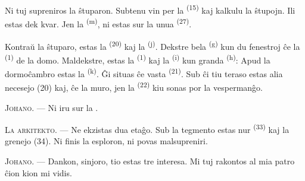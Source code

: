 Ni tuj supreniros la ŝtuparon. Subtenu vin per la 
\textsuperscript{(15)} kaj kalkulu la ŝtupojn. Ili estas dek kvar. Jen la
 \textsuperscript{(m)}, ni estas sur la unua 
\textsuperscript{(27)}.

\VUsaut{3.0mm}
\VUsaut{3.0mm}

Kontraŭ la ŝtuparo, estas la  \textsuperscript{(20)} kaj la
 \textsuperscript{(j)}. Dekstre bela 
\textsuperscript{(g)} kun du fenestroj ĉe la 
\textsuperscript{(1)} de la domo. Maldekstre, estas la 
\textsuperscript{(1)} kaj la  \textsuperscript{(i)}
kun granda  \textsuperscript{(h)}: Apud la dormoĉambro estas la
 \textsuperscript{(k)}. Ĝi situas ĉe vasta
 \textsuperscript{(21)}. Sub ĉi tiu teraso estas alia necesejo
(20) kaj, ĉe la muro, jen la  \textsuperscript{(22)} kiu
sonas por la vespermanĝo.

\textsc{Johano}. --- Ni iru sur la .

\textsc{La arkitekto}. --- Ne ekzistas dua etaĝo. Sub la tegmento estas nur
 \textsuperscript{(33)} kaj la grenejo (34). Ni finis la
esploron, ni povas malsupreniri.

\textsc{Johano}. --- Dankon, sinjoro, tio estas tre interesa. Mi tuj rakontos
al mia patro ĉion kion mi vidis.
\VUsaut{4.0mm}
\VUfilet{22mm}
